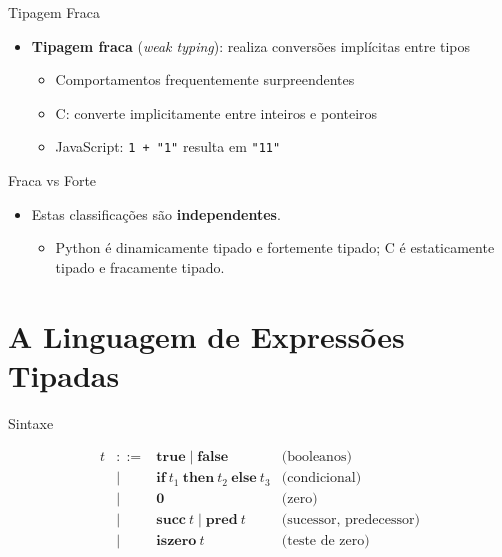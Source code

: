\begin{frame}[fragile]{Tipagem Fraca}

    \begin{itemize}

        \item
        \textbf{Tipagem fraca} (\emph{weak typing}): realiza conversões
        implícitas entre tipos

        \begin{itemize}

            \item
            Comportamentos frequentemente surpreendentes
            \item
            C: converte implicitamente entre inteiros e ponteiros
            \item
            JavaScript: \texttt{1 + "1"} resulta em
            \texttt{"11"}
        \end{itemize}
    \end{itemize}
\end{frame}

\begin{frame}{Fraca vs Forte}

    \begin{itemize}

        \item
        Estas classificações são \textbf{independentes}.

        \begin{itemize}

            \item
            Python é dinamicamente tipado e fortemente tipado; C é estaticamente
            tipado e fracamente tipado.
        \end{itemize}
    \end{itemize}
\end{frame}


\section{A Linguagem de Expressões
Tipadas}\label{a-linguagem-de-expressuxf5es-tipadas}

\begin{frame}{Sintaxe}

    \[\begin{array}{lcll}
    t & ::= & \mathbf{true} \mid \mathbf{false} & \text{(booleanos)} \\
    & \mid & \mathbf{if}\ t_1\ \mathbf{then}\ t_2\ \mathbf{else}\ t_3 & \text{(condicional)} \\
    & \mid & \mathbf{0} & \text{(zero)} \\
    & \mid & \mathbf{succ}\ t \mid \mathbf{pred}\ t & \text{(sucessor, predecessor)} \\
    & \mid & \mathbf{iszero}\ t & \text{(teste de zero)}
\end{array}\]
\end{frame}

